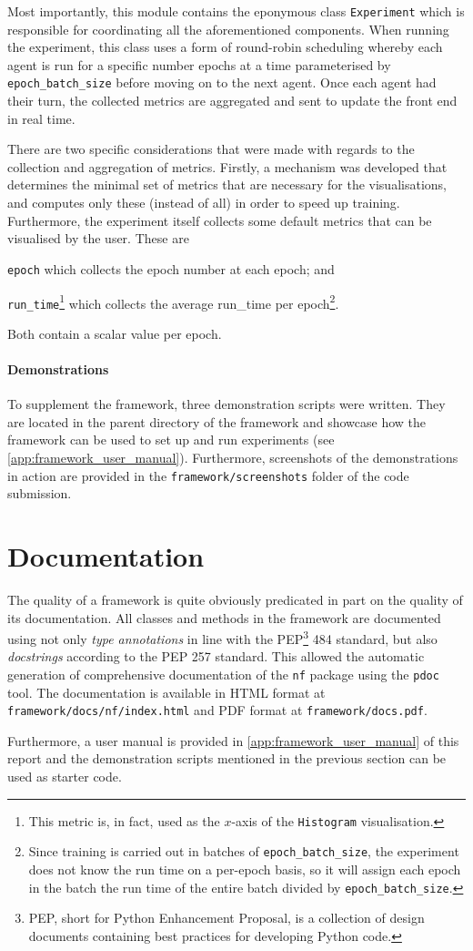 Most importantly, this module contains the eponymous class \texttt{Experiment} which is responsible for coordinating all the aforementioned components.
When running the experiment, this class uses a form of round-robin scheduling whereby each agent is run for a specific number epochs at a time parameterised by \texttt{epoch\_batch\_size} before moving on to the next agent.
Once each agent had their turn, the collected metrics are aggregated and sent to update the front end in real time.

There are two specific considerations that were made with regards to the collection and aggregation of metrics. 
Firstly, a mechanism was developed that determines the minimal set of metrics that are necessary for the visualisations, and computes only these (instead of all) in order to speed up training.
Furthermore, the experiment itself collects some default metrics that can be visualised by the user.
These are
\begin{enumerate*}[label=(\roman*)]
    \item \texttt{epoch} which collects the epoch number at each epoch; and
    \item \texttt{run\_time}\footnote{This metric is, in fact, used as the $x$-axis of the \texttt{Histogram} visualisation.} which collects the average run\_time per epoch\footnote{Since training is carried out in batches of \texttt{epoch\_batch\_size}, the experiment does not know the run time on a per-epoch basis, so it will assign each epoch in the batch the run time of the entire batch divided by \texttt{epoch\_batch\_size}.}.
\end{enumerate*}
Both contain a scalar value per epoch.

\paragraph{Demonstrations}
To supplement the framework, three demonstration scripts were written.
They are located in the parent directory of the framework and showcase how the framework can be used to set up and run experiments (see \ref{app:framework_user_manual}).
Furthermore, screenshots of the demonstrations in action are provided in the \texttt{framework/screenshots} folder of the code submission.

\section{Documentation}
The quality of a framework is quite obviously predicated in part on the quality of its documentation.
All classes and methods in the framework are documented using not only \textit{type annotations} in line with the PEP\footnote{PEP, short for Python Enhancement Proposal, is a collection of design documents containing best practices for developing Python code.} 484 standard, but also \textit{docstrings} according to the PEP 257 standard.
This allowed the automatic generation of comprehensive documentation of the \texttt{nf} package using the \texttt{pdoc} tool. 
The documentation is available in HTML format at \texttt{framework/docs/nf/index.html} and PDF format at \texttt{framework/docs.pdf}.

Furthermore, a user manual is provided in \ref{app:framework_user_manual} of this report and the demonstration scripts mentioned in the previous section can be used as starter code.

